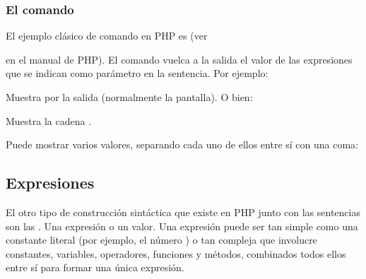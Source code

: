 \documentclass[a4paper,12pt,spanish]{sphinxmanual}
\begin{document}
\ignorespaces 

\subsubsection{El comando }
\label{\detokenize{php:index-6}}\label{\detokenize{php:el-comando-echo}}
El ejemplo clásico de comando en PHP es  (ver %
\begin{footnote}[1]\sphinxAtStartFootnote
{}
%
\end{footnote} en el manual de PHP). El comando
 vuelca a la salida el valor de las expresiones que se indican como
parámetro en la sentencia. Por ejemplo:

\begin{sphinxVerbatim}[commandchars=\\\{\}]
   
\end{sphinxVerbatim}

Muestra  por la salida (normalmente la pantalla). O bien:

\begin{sphinxVerbatim}[commandchars=\\\{\}]
 
\end{sphinxVerbatim}

Muestra la cadena .

Puede mostrar varios valores, separando cada uno de ellos entre sí con una
coma:

\begin{sphinxVerbatim}[commandchars=\\\{\}]
    
\end{sphinxVerbatim}

\ignorespaces 

\subsection{Expresiones}
\label{\detokenize{php:expresiones}}\label{\detokenize{php:index-7}}
El otro tipo de construcción sintáctica que existe en PHP junto con las
sentencias son las . Una expresión  o  un
valor. Una expresión puede ser tan simple como una constante literal (por
ejemplo, el número ) o tan compleja que involucre constantes, variables,
operadores, funciones y métodos, combinados todos ellos entre sí para formar una
única expresión.
\end{document}
